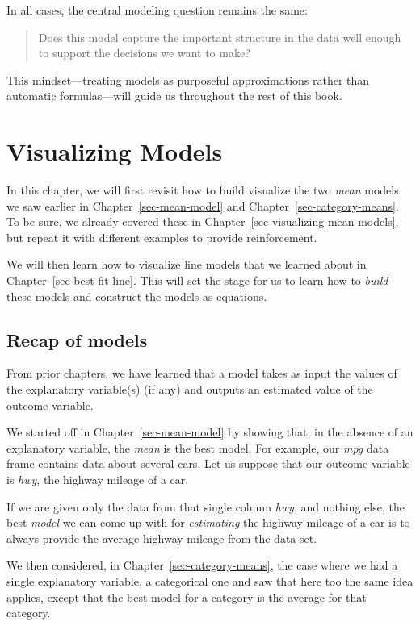 \documentclass[
  12pt,
  letterpaper,
  DIV=11,
  numbers=noendperiod]{scrreprt}
\begin{document}
In all cases, the central modeling question remains the same:

\begin{quote}
Does this model capture the important structure in the data well enough
to support the decisions we want to make?
\end{quote}

This mindset---treating models as purposeful approximations rather than
automatic formulas---will guide us throughout the rest of this book.

\chapter{Visualizing Models}\label{sec-visualizing-models}

In this chapter, we will first revisit how to build visualize the two
\emph{mean} models we saw earlier in Chapter~\ref{sec-mean-model} and
Chapter~\ref{sec-category-means}. To be sure, we already covered these
in Chapter~\ref{sec-visualizing-mean-models}, but repeat it with
different examples to provide reinforcement.

We will then learn how to visualize line models that we learned about in
Chapter~\ref{sec-best-fit-line}. This will set the stage for us to learn
how to \emph{build} these models and construct the models as equations.

\section{Recap of models}\label{recap-of-models}

From prior chapters, we have learned that a model takes as input the
values of the explanatory variable(s) (if any) and outputs an estimated
value of the outcome variable.

We started off in Chapter~\ref{sec-mean-model} by showing that, in the
absence of an explanatory variable, the \emph{mean} is the best model.
For example, our \emph{mpg} data frame contains data about several cars.
Let us suppose that our outcome variable is \emph{hwy}, the highway
mileage of a car.

If we are given only the data from that single column \emph{hwy}, and
nothing else, the best \emph{model} we can come up with for
\emph{estimating} the highway mileage of a car is to always provide the
average highway mileage from the data set.

We then considered, in Chapter~\ref{sec-category-means}, the case where
we had a single explanatory variable, a categorical one and saw that
here too the same idea applies, except that the best model for a
category is the average for that category.
\end{document}

